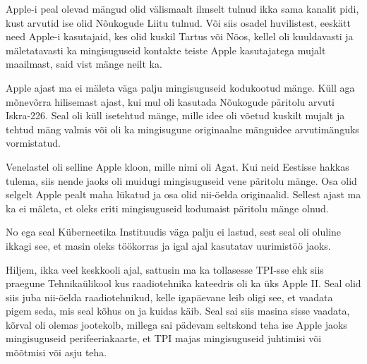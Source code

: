 
Apple-i peal olevad mängud olid välismaalt ilmselt tulnud ikka sama kanalit pidi, kust 
arvutid ise olid Nõukogude Liitu tulnud. Või siis osadel huvilistest, eeskätt need 
Apple-i kasutajaid, kes olid kuskil Tartus või Nõos, kellel oli kuuldavasti ja 
mäletatavasti ka mingisuguseid kontakte teiste Apple kasutajatega mujalt 
maailmast, said vist mänge neilt ka.


Apple ajast ma ei mäleta väga palju mingisuguseid kodukootud mänge. 
Küll aga mõnevõrra hilisemast ajast, kui mul oli kasutada Nõukogude 
päritolu arvuti 
Iskra-226. Seal oli küll 
isetehtud mänge, mille idee oli võetud kuskilt mujalt ja tehtud mäng valmis  
või oli ka mingisugune originaalne mänguidee arvutimänguks vormistatud. 

Venelastel oli selline Apple kloon, mille  nimi oli  Agat. 
Kui neid Eestisse hakkas tulema, siis nende jaoks oli muidugi mingisuguseid vene 
päritolu mänge. Osa  olid selgelt Apple pealt maha lükatud ja osa olid  
nii-öelda originaalid. Sellest ajast ma ka ei mäleta, et oleks eriti
mingisuguseid kodumaist päritolu mänge  olnud.


No ega seal Küberneetika Instituudis väga palju 
ei lastud, sest seal oli oluline ikkagi see, et masin oleks töökorras ja igal 
ajal kasutatav  uurimistöö jaoks.

Hiljem, ikka veel keskkooli ajal, sattusin ma ka tollasesse TPI-sse ehk siis 
praegune Tehnikaülikool kus raadiotehnika 
kateedris oli ka üks Apple II.  Seal olid siis juba 
nii-öelda raadiotehnikud, kelle igapäevane leib oligi see,  et vaadata pigem 
seda, mis seal kõhus on ja kuidas käib. Seal sai siis masina sisse vaadata, 
kõrval oli olemas  jootekolb, millega sai pädevam seltskond teha ise Apple 
jaoks mingisuguseid perifeeriakaarte, et TPI majas mingisuguseid juhtimisi või 
mõõtmisi või asju teha.  

